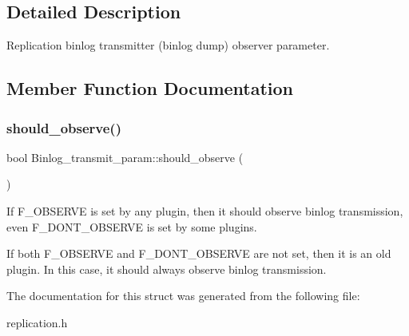 \subsection{Detailed Description}
Replication binlog transmitter (binlog dump) observer parameter. 

\subsection{Member Function Documentation}
\mbox{\label{structBinlog__transmit__param_a2de96979dea739113c6d0df8ff53d336}} 
\subsubsection{\texorpdfstring{should\+\_\+observe()}{should\_observe()}}
{\footnotesize\ttfamily bool Binlog\+\_\+transmit\+\_\+param\+::should\+\_\+observe (\begin{DoxyParamCaption}{ }\end{DoxyParamCaption})\hspace{0.3cm}{\ttfamily [inline]}}

If F\+\_\+\+O\+B\+S\+E\+R\+VE is set by any plugin, then it should observe binlog transmission, even F\+\_\+\+D\+O\+N\+T\+\_\+\+O\+B\+S\+E\+R\+VE is set by some plugins.

If both F\+\_\+\+O\+B\+S\+E\+R\+VE and F\+\_\+\+D\+O\+N\+T\+\_\+\+O\+B\+S\+E\+R\+VE are not set, then it is an old plugin. In this case, it should always observe binlog transmission. 

The documentation for this struct was generated from the following file\+:\begin{DoxyCompactItemize}
\item 
replication.\+h\end{DoxyCompactItemize}
